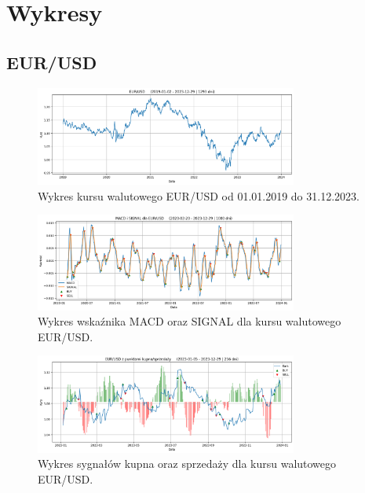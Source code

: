 \documentclass[12pt, a4paper]{article}
\begin{document}
\pagebreak






\section{Wykresy}
\label{sec:Wykresy}

\subsection{EUR/USD}

\begin{figure}[ht]
    \centering
    \includegraphics[width=0.77\textwidth]{eur_usd_value.png}
    \caption{Wykres kursu walutowego EUR/USD od 01.01.2019 do 31.12.2023.}
    \label{fig:all:eur_usd_value}
\end{figure}
\begin{figure}[ht]
    \centering
    \includegraphics[width=0.77\textwidth]{eur_usd_macd_signal.png}
    \caption{Wykres wskaźnika MACD oraz SIGNAL dla kursu walutowego EUR/USD.}
    \label{fig:all:eur_usd_macd_signal}
\end{figure}
\begin{figure}[ht]
    \centering
    \includegraphics[width=0.77\textwidth]{eur_usd_value_buy_sell.png}
    \caption{Wykres sygnałów kupna oraz sprzedaży dla kursu walutowego EUR/USD.}
    \label{fig:all:eur_usd_value_buy_sell}
\end{figure}
\end{document}
